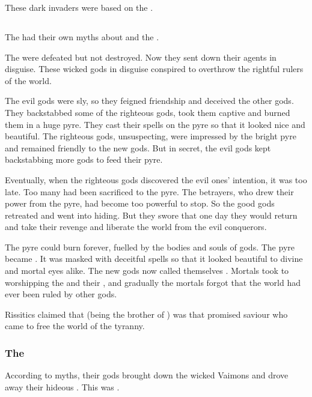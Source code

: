 These dark invaders were based on the \banes. 






\subsection{\Iquin}
The \Ortaicans had their own myths about \Iquin and the \sephiroth.

The  were defeated but not destroyed. 
Now they sent down their agents in disguise. 
These wicked gods in disguise conspired to overthrow the rightful rulers of the world. 

The evil gods were sly, so they feigned friendship and deceived the other gods. 
They backstabbed some of the righteous gods, took them captive and burned them in a huge pyre. 
They cast their spells on the pyre so that it looked nice and beautiful. 
The righteous gods, unsuspecting, were impressed by the bright pyre and remained friendly to the new gods. 
But in secret, the evil gods kept backstabbing more gods to feed their pyre. 

Eventually, when the righteous gods discovered the evil ones' intention, it was too late. 
Too many had been sacrificed to the pyre.
The betrayers, who drew their power from the pyre, had become too powerful to stop.
So the good gods retreated and went into hiding.
But they swore that one day they would return and take their revenge and liberate the world from the evil conquerors. 

The pyre could burn forever, fuelled by the bodies and souls of gods. 
The pyre became \iquin. 
It was masked with deceitful spells so that it looked beautiful to divine and mortal eyes alike.
The new gods now called themselves \sephiroth. 
Mortals took to worshipping the \sephiroth and their \iquin, and gradually the mortals forgot that the world had ever been ruled by other gods. 

Rissitics claimed that  (being the brother of ) was that promised saviour who came to free the world of the \iquinian tyranny. 





\subsubsection{The \HundredScourges}
According to \Ortaican myths, their gods brought down the wicked Vaimons and drove away their hideous \Archons. 
This was . 

